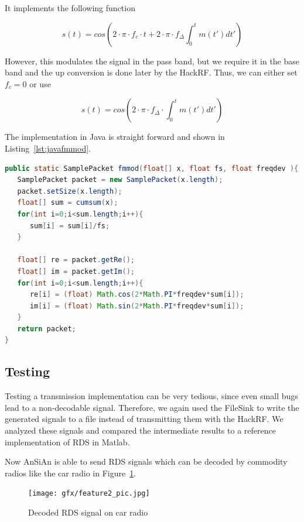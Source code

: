 It implements the following function 

\begin{equation}
 s(t) = cos\left(2\cdot \pi \cdot f_c \cdot t + 2\cdot \pi\cdot f_\Delta \int_{0}^{t}m(t')dt'\right)
\end{equation}

However, this modulates the signal in the pass band, but we require it in the base band and the up conversion is done later by the HackRF. Thus, we can either set $f_c=0$ or use 

\begin{equation}
s(t) = cos\left(2\cdot \pi \cdot f_\Delta  \cdot \int_{0}^{t}m(t')dt'\right)
\end{equation}


The implementation in Java is straight forward and shown in Listing~\ref{lst:javafmmod}.
\begin{lstlisting}[label=lst:javafmmod, caption=Java Implementation of fmmod, language=java,]
public static SamplePacket fmmod(float[] x, float fs, float freqdev ){
   SamplePacket packet = new SamplePacket(x.length);
   packet.setSize(x.length);
   float[] sum = cumsum(x);
   for(int i=0;i<sum.length;i++){
      sum[i] = sum[i]/fs;
   }
	
   float[] re = packet.getRe();
   float[] im = packet.getIm();
   for(int i=0;i<sum.length;i++){
      re[i] = (float) Math.cos(2*Math.PI*freqdev*sum[i]);
      im[i] = (float) Math.sin(2*Math.PI*freqdev*sum[i]);
   }
   return packet;
}

\end{lstlisting}



\subsection{Testing} 
Testing a transmission implementation can be very tedious, since even small bugs lead to a non-decodable signal. Therefore, we again used the FileSink to write the generated signals to a file instead of transmitting them with the HackRF. We analyzed these signals and compared the intermediate results to a reference implementation of RDS in Matlab. 

Now AnSiAn is able to send RDS signals which can be decoded by commodity radios like the car radio in Figure~\ref{fig:impl:picrds}.

\begin{figure}
	\centering
	\texttt{[image: gfx/feature2\_pic.jpg]}
	\caption{Decoded RDS signal on car radio}
	\label{fig:impl:picrds}
\end{figure}

